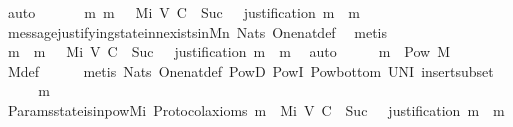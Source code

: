 \begin{isabellebody}
\ auto\isanewline
\ \ \isamarkupfalse%
\ \isamarkupfalse%
\ {\isachardoublequoteopen}{\isasymexists}\ m{\isacharprime}{\isachardot}\ m{\isacharprime}\ {\isasymin}\ \ M{\isacharunderscore}i\ {\isacharparenleft}V{\isacharcomma}\ C{\isacharcomma}\ {\isasymepsilon}{\isacharparenright}\ {\isacharparenleft}Suc\ {}{\isacharparenright}\ {\isasymand}\ justification\ m{\isacharprime}\ {\isacharequal}\ {\isacharbraceleft}m{\isacharbraceright}{\isachardoublequoteclose}\isanewline
\ \ \ \ \isamarkupfalse%
\ message{\isacharunderscore}justifying{\isacharunderscore}state{\isacharunderscore}in{\isacharunderscore}{\isasymSigma}{\isacharunderscore}n{\isacharunderscore}exists{\isacharunderscore}in{\isacharunderscore}M{\isacharunderscore}n\ Nats{\isacharunderscore}{}\ One{\isacharunderscore}nat{\isacharunderscore}def\ \isamarkupfalse%
\ metis\isanewline
\ \ \isamarkupfalse%
\ \isamarkupfalse%
\ m{\isacharprime}\ \ {\isachardoublequoteopen}m{\isacharprime}\ {\isasymin}\ \ M{\isacharunderscore}i\ {\isacharparenleft}V{\isacharcomma}\ C{\isacharcomma}\ {\isasymepsilon}{\isacharparenright}\ {\isacharparenleft}Suc\ {}{\isacharparenright}\ {\isasymand}\ justification\ m{\isacharprime}\ {\isacharequal}\ {\isacharbraceleft}m{\isacharbraceright}{\isachardoublequoteclose}\ \isamarkupfalse%
\ auto\isanewline
\ \ \isamarkupfalse%
\ \isamarkupfalse%
\ {\isachardoublequoteopen}{\isacharbraceleft}m{\isacharprime}{\isacharbraceright}\ {\isasymin}\ Pow\ M{\isachardoublequoteclose}\ \isanewline
\ \ \ \ \isamarkupfalse%
\ M{\isacharunderscore}def\isanewline
\ \ \ \ \isamarkupfalse%
\ {\isacharparenleft}metis\ Nats{\isacharunderscore}{}\ One{\isacharunderscore}nat{\isacharunderscore}def\ PowD\ PowI\ Pow{\isacharunderscore}bottom\ UN{\isacharunderscore}I\ insert{\isacharunderscore}subset{\isacharparenright}\isanewline
\ \ \isamarkupfalse%
\ \isamarkupfalse%
\ {\isachardoublequoteopen}{\isacharbraceleft}m{\isacharprime}{\isacharbraceright}\ {\isasymnotin}\ {\isasymSigma}{\isachardoublequoteclose}\isanewline
\ \ \ \ \isamarkupfalse%
\ Params{\isachardot}state{\isacharunderscore}is{\isacharunderscore}in{\isacharunderscore}pow{\isacharunderscore}M{\isacharunderscore}i\ Protocol{\isacharunderscore}axioms\ {\isacartoucheopen}m{\isacharprime}\ {\isasymin}\ M{\isacharunderscore}i\ {\isacharparenleft}V{\isacharcomma}\ C{\isacharcomma}\ {\isasymepsilon}{\isacharparenright}\ {\isacharparenleft}Suc\ {}{\isacharparenright}\ {\isasymand}\ justification\ m{\isacharprime}\ {\isacharequal}\ {\isacharbraceleft}m{\isacharbraceright}{\isacartoucheclose}\ \isamarkupfalse%

\end{isabellebody}
